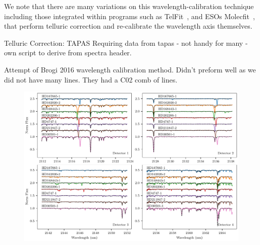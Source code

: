 We note that there are many variations on this wavelength-calibration technique including those integrated within programs such as TelFit~\citet{gullikson_correcting_2014}, and ESOs Molecfit~\citet{smette_molecfit_2015}, that perform telluric correction and re-calibrate the wavelength axis themselves.







Telluric Correction:
TAPAS
Requiring data from tapas
- not handy for many
- own script to derive from spectra header.


Attempt of Brogi 2016 wavelength calibration method. Didn't preform well as we did not have many lines. They had a C02 comb of lines. 


\begin{figure}
    \centering
    \includegraphics[width=1\linewidth]{figures/reduction/Spectra_examples}
    \caption{}
    \label{fig:spectraexamples}
\end{figure}


